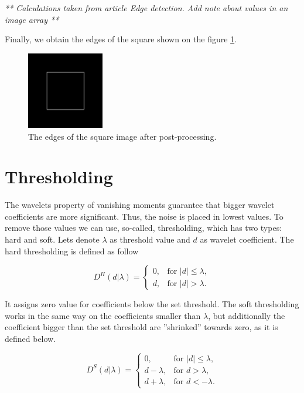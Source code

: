 \textit{** Calculations taken from article Edge detection. Add note about values in an image array **}

Finally, we obtain the edges of the square shown on the figure \ref{fig:square_idwt_pp}.

\begin{figure}[h]
	\centering
	\includegraphics[width=0.3\textwidth]{graphs/square_db2_pp.png}
	\caption{The edges of the square image after post-processing.}
	\label{fig:square_idwt_pp}
\end{figure}

\section{Thresholding}
\label{sec:threshold}

The wavelets property of vanishing moments guarantee that bigger wavelet coefficients are more significant. Thus, the noise is placed in lowest values. To remove those values we can use, so-called, thresholding, which has two types: hard and soft. Lets denote $\lambda$ as threshold value and $d$ as wavelet coefficient. The hard thresholding is defined as follow

\begin{equation}
D^H(d|\lambda)=
\begin{cases}
0, & \text{for } |d| \leq \lambda, \\
d, & \text{for } |d| > \lambda.
\end{cases}
\end{equation}

It assigns zero value for coefficients below the set threshold. The soft thresholding works in the same way on the coefficients smaller than $\lambda$, but additionally the coefficient bigger than the set threshold are ''shrinked'' towards zero, as it is defined below.

\begin{equation}
D^S(d|\lambda)=
\begin{cases}
	0, & \text{for } |d| \leq \lambda, \\
	d-\lambda, & \text{for } d > \lambda, \\
	d+\lambda, & \text{for } d < -\lambda.
\end{cases}
\end{equation}


